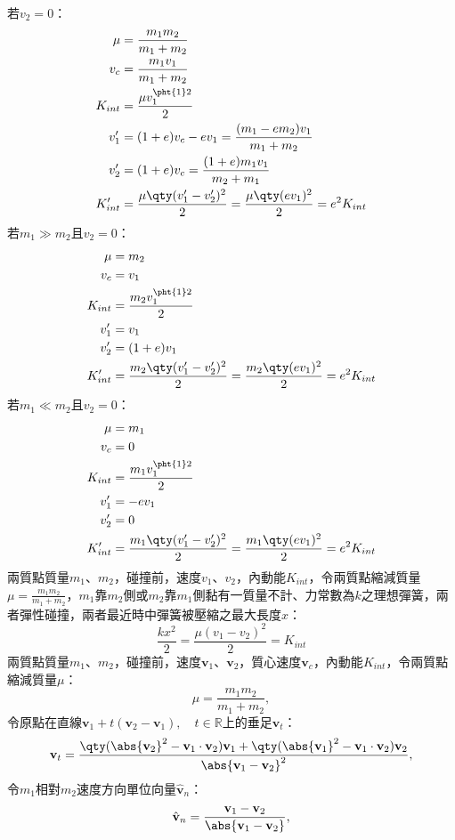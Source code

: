 \documentclass[a4paper,12pt]{article}
\begin{document}
若$v_2=0$：
\[\begin{aligned}
\mu&=\frac{m_1m_2}{m_1+m_2}\\
v_c &= \frac{m_1v_1}{m_1+m_2} \\
K_{int} &= \frac{\mu v_1^{\pht{1}2}}{2}\\
v_1' &= (1+e)v_c - ev_1 = \frac{(m_1-em_2)v_1}{m_1+m_2} \\
v_2' &= (1+e)v_c = \frac{(1+e)m_1v_1}{m_2+m_1} \\
K_{int}' &= \frac{\mu \qty(v_1'-v_2')^2}{2} = \frac{\mu \qty(ev_1)^2}{2} = e^2K_{int}
\end{aligned}\]
若$m_1\gg m_2$且$v_2=0$：
\[\begin{aligned}
\mu&=m_2\\
v_c &= v_1 \\
K_{int} &= \frac{m_2v_1^{\pht{1}2}}{2}\\
v_1' &= v_1 \\
v_2' &= (1+e)v_1 \\
K_{int}' &= \frac{m_2 \qty(v_1'-v_2')^2}{2} = \frac{m_2 \qty(ev_1)^2}{2} = e^2K_{int}
\end{aligned}\]
若$m_1\ll m_2$且$v_2=0$：
\[\begin{aligned}
\mu&=m_1\\
v_c &= 0 \\
K_{int} &= \frac{m_1v_1^{\pht{1}2}}{2}\\
v_1' &= -ev_1 \\
v_2' &= 0 \\
K_{int}' &= \frac{m_1\qty(v_1'-v_2')^2}{2} = \frac{m_1\qty(ev_1)^2}{2} = e^2K_{int}
\end{aligned}\]
兩質點質量$m_1$、$m_2$，碰撞前，速度$v_1$、$v_2$，內動能$K_{int}$，令兩質點縮減質量$\mu=\frac{m_1m_2}{m_1+m_2}$，$m_1$靠$m_2$側或$m_2$靠$m_1$側黏有一質量不計、力常數為$k$之理想彈簧，兩者彈性碰撞，兩者最近時中彈簧被壓縮之最大長度$x$：
\[ \frac{kx^2}{2} = \frac{\mu (v_1-v_2)^2}{2} = K_{int} \]
兩質點質量$m_1$、$m_2$，碰撞前，速度$\mathbf{v}_1$、$\mathbf{v}_2$，質心速度$\mathbf{v}_c$，內動能$K_{int}$，令兩質點縮減質量$\mu$：
\[\mu=\frac{m_1m_2}{m_1+m_2},\]
令原點在直線$\mathbf{v}_1+t(\mathbf{v}_2-\mathbf{v}_1),\quad t\in\mathbb{R}$上的垂足$\mathbf{v}_t$：
\[\mathbf{v}_t=\frac{\qty(\abs{\mathbf{v}_2}^2-\mathbf{v}_1\cdot\mathbf{v}_2)\mathbf{v}_1+\qty(\abs{\mathbf{v}_1}^2-\mathbf{v}_1\cdot\mathbf{v}_2)\mathbf{v}_2}{\abs{\mathbf{v}_1-\mathbf{v}_2}^2},\]
令$m_1$相對$m_2$速度方向單位向量$\hat{\mathbf{v}}_n$：
\[\hat{\mathbf{v}}_n=\frac{\mathbf{v}_1-\mathbf{v}_2}{\abs{\mathbf{v}_1-\mathbf{v}_2}},\]
\end{document}
